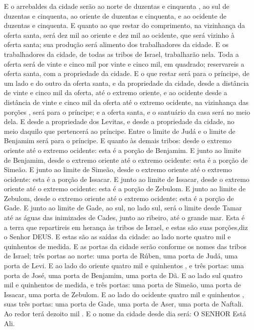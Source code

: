 {E o arrebaldes da cidade serão ao norte de duzentas e cinquenta
{} , ao sul de duzentas e cinquenta, ao oriente de duzentas e cinquenta, e ao ocidente de duzentas e cinquenta.
E quanto ao que restar do comprimento, na vizinhança da oferta santa, será dez mil
{} ao oriente e dez mil ao ocidente, que será vizinho à oferta santa; sua produção será alimento dos trabalhadores da cidade.
E os trabalhadores da cidade, de todas as tribos de Israel, trabalharão nela.
Toda a oferta será de vinte e cinco mil
{} por vinte e cinco mil, em quadrado; reservareis a oferta santa, com a propriedade da cidade.
E o que restar será para o príncipe, de um lado e do outro da oferta santa, e da propriedade da cidade, desde a distância de vinte e cinco mil
{} da oferta, até o extremo oriente, e ao ocidente desde a distância de vinte e cinco mil
{} da oferta até o extremo ocidente, na vizinhança das porções
{} , será para o príncipe; e a oferta santa, e o santuário da casa será no meio dela.
E desde a propriedade dos Levitas, e desde a propriedade da cidade,
{} no meio daquilo que pertencerá ao príncipe. Entre o limite de Judá e o limite de Benjamim será para o príncipe.
E quanto às demais tribos: desde o extremo oriente até o extremo ocidente: esta é a porção de Benjamim.
E junto ao limite de Benjamim, desde o extremo oriente até o extremo ocidente: esta é a porção de Simeão.
E junto ao limite de Simeão, desde o extremo oriente até o extremo ocidente: esta é a porção de Issacar.
E junto ao limite de Issacar, desde o extremo oriente até o extremo ocidente: esta é a porção de Zebulom.
E junto ao limite de Zebulom, desde o extremo oriente até o extremo ocidente: esta é a porção de Gade.
E junto ao limite de Gade, ao sul, no lado sul, será o limite desde Tamar até as águas das inimizades de Cades, junto ao ribeiro, até o grande mar.
Esta é a terra que repartireis em herança às tribos de Israel, e estas são suas porções,diz o Senhor DEUS.
E estas são as saídas da cidade: ao lado norte quatro mil e quinhentos
{} de medida.
E as portas da cidade serão conforme os nomes das tribos de Israel; três portas ao norte: uma porta de Rúben, uma porta de Judá,
{} uma porta de Levi.
E ao lado do oriente quatro mil e quinhentos
{} , e três portas: uma porta de José, uma porta de Benjamim,
{} uma porta de Dã.
E ao lado sul quatro mil e quinhentos
{} de medida, e três portas: uma porta de Simeão, uma porta de Issacar,
{} uma porta de Zebulom.
E ao lado do ocidente quatro mil e quinhentos
{} ,{} suas três portas: uma porta de Gade, uma porta de Aser,
{} uma porta de Naftali.
Ao redor terá dezoito mil
{} . E o nome da cidade desde
{} dia será: O SENHOR Está Ali.
\par }